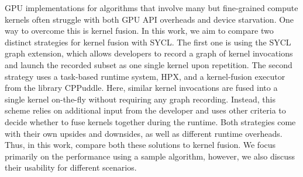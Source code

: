 GPU implementations for algorithms that involve many but fine-grained compute kernels often struggle with both GPU API overheads and device starvation.
One way to overcome this is kernel fusion.
In this work, we aim to compare two distinct strategies for kernel fusion with SYCL.
The first one is using the SYCL graph extension, which allows developers to record a graph of kernel invocations and launch the recorded subset as one single kernel upon repetition.
The second strategy uses a task-based runtime system, HPX, and a kernel-fusion executor from the library CPPuddle.
Here, similar kernel invocations are fused into a single kernel on-the-fly without requiring any graph recording. Instead, this scheme relies on additional input from the developer and uses other criteria to decide whether to fuse kernels together during the runtime.
Both strategies come with their own upsides and downsides, as well as different runtime overheads.
Thus, in this work, compare both these solutions to kernel fusion. We focus primarily on the performance using a sample algorithm, however, we also discuss their usability for different scenarios.
